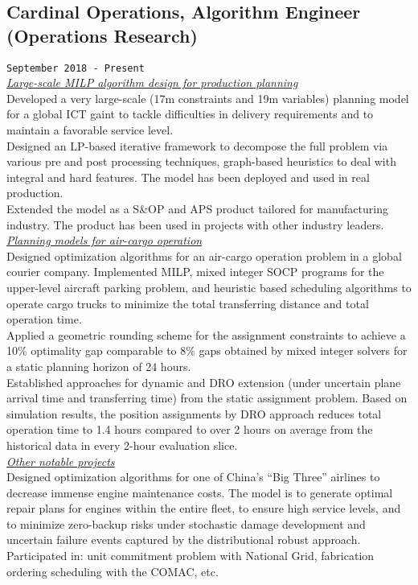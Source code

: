\documentclass[10pt, letter]{article}
\begin{document}
\subsection{Cardinal Operations, Algorithm Engineer (Operations
Research)}
\texttt{September 2018 - Present} \\
\underline{\textit{Large-scale MILP algorithm design for production
planning}} \\
\bullet\quad Developed a very large-scale (17m constraints and 19m
variables) planning model for a global ICT gaint to tackle difficulties
in delivery requirements and to maintain a favorable service level. \\
\bullet\quad Designed an LP-based iterative framework to decompose the
full problem via various pre and post processing techniques, graph-based
heuristics to deal with integral and hard features. The model has been
deployed and used in real production. \\
\bullet\quad Extended the model as a S\&OP and APS product tailored for
manufacturing industry. The product has been used in projects with other
industry leaders. \\
\underline{\textit{Planning models for air-cargo operation}} \\
\bullet\quad Designed optimization algorithms for an air-cargo operation
problem in a global courier company. Implemented MILP, mixed integer
SOCP programs for the upper-level aircraft parking problem, and
heuristic based scheduling algorithms to operate cargo trucks to
minimize the total transferring distance and total operation time. \\
\bullet\quad Applied a geometric rounding scheme for the assignment
constraints to achieve a 10\% optimality gap comparable to 8\% gaps
obtained by mixed integer solvers for a static planning horizon of 24
hours. \\
\bullet\quad Established approaches for dynamic and DRO extension (under
uncertain plane arrival time and transferring time) from the static
assignment problem. Based on simulation results, the position
assignments by DRO approach reduces total operation time to 1.4 hours
compared to over 2 hours on average from the historical data in every
2-hour evaluation slice. \\
\underline{\textit{Other notable projects}} \\
\bullet\quad Designed optimization algorithms for one of China's ``Big
Three'' airlines to decrease immense engine maintenance costs. The model
is to generate optimal repair plans for engines within the entire fleet,
to ensure high service levels, and to minimize zero-backup risks under
stochastic damage development and uncertain failure events captured by
the distributional robust approach. \\
\bullet\quad Participated in: unit commitment problem with National
Grid, fabrication ordering scheduling with the COMAC, etc. \\
\end{document}
